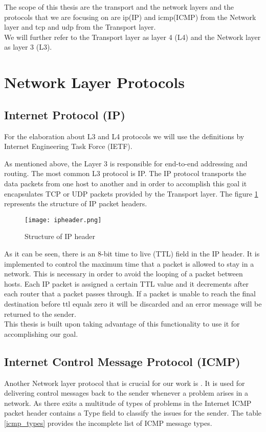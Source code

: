 The scope of this thesis are the transport and the network layers and the protocols that we are focusing on are \acl{ip}(IP) and \acl{icmp}(ICMP) from the Network layer  and \acl{tcp} and \acl{udp} from the Transport layer.\\
We will further refer to the Transport layer as layer 4 (L4) and the Network layer as layer 3 (L3).

\section{Network Layer Protocols}
\subsection{Internet Protocol (IP)}
\label{ip_descr}
For the elaboration about L3 and L4 protocols we will use the definitions by Internet Engineering Task Force (IETF)\cite{ietf_ip}.

As mentioned above, the Layer 3 is responsible for end-to-end addressing and routing. The most common L3 protocol is IP. 
The IP protocol transports the data packets from one host to another and in order to accomplish this goal it encapsulates TCP or UDP packets provided by the Transport layer. 
The figure \ref{ip_header}\cite{iph} represents the structure of IP packet headers.

\begin{figure}[H]
 \centering
 \texttt{[image: ipheader.png]}
 \caption{Structure of IP header}
 \label{ip_header}
\end{figure}

As it can be seen, there is an 8-bit time to live (TTL) field in the IP header. It is implemented to control the maximum time that a packet is allowed to stay in a network. This is necessary in order to avoid the looping of a packet between hosts. Each IP packet is assigned a certain TTL value and it decrements after each router that a packet passes through. If a packet is unable to reach the final destination before ttl equals zero it will be discarded and an error message will be returned to the sender.\\
This thesis is built upon taking advantage of this functionality to use it for accomplishing our goal.


\subsection{Internet Control Message Protocol (ICMP)}
\label{icmp_section}
Another Network layer protocol that is crucial for our work is . 
It is used for delivering control messages back to the sender whenever a problem arises in a network\cite{ietf_icmp}. As there exits a multitude of types of problems in the Internet ICMP packet header contains a Type field to classify the issues for the sender. 
The table \ref{icmp_types} provides the incomplete list of ICMP message types.

